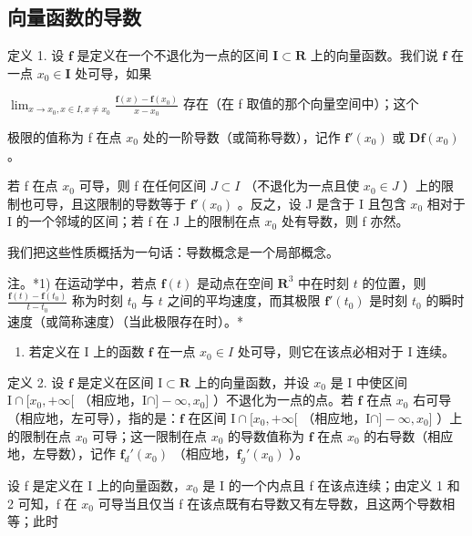 \subsection{向量函数的导数}

定义 1. 设 \(\mathbf{f}\) 是定义在一个不退化为一点的区间 \(\mathbf{I} \subset \mathbf{R}\) 上的向量函数。我们说 \(\mathbf{f}\) 在一点 \(x_0 \in \mathbf{I}\) 处可导，如果

\(\lim_{x\to x_{0},x\in I,x\neq x_{0}}\frac{\mathbf{f}(x)-\mathbf{f}(x_{0})}{x-x_{0}}\) 存在（在 f 取值的那个向量空间中）；这个

极限的值称为 f 在点 \(x_{0}\) 处的一阶导数（或简称导数），记作 \(\mathbf{f}'(x_{0})\) 或 \(\mathbf{D}\mathbf{f}(x_{0})\) 。

若 f 在点 \(x_{0}\) 可导，则 f 在任何区间 \(J \subset I\) （不退化为一点且使 \(x_{0} \in J\) ）上的限制也可导，且这限制的导数等于 \(\mathbf{f}'(x_{0})\) 。反之，设 J 是含于 I 且包含 \(x_{0}\) 相对于 I 的一个邻域的区间；若 f 在 J 上的限制在点 \(x_{0}\) 处有导数，则 f 亦然。

我们把这些性质概括为一句话：导数概念是一个局部概念。

注。*1) 在运动学中，若点 \(\mathbf{f}(t)\) 是动点在空间 \(\mathbf{R}^3\) 中在时刻 \(t\) 的位置，则 \(\frac{\mathbf{f}(t) - \mathbf{f}(t_0)}{t - t_0}\) 称为时刻 \(t_0\) 与 \(t\) 之间的平均速度，而其极限 \(\mathbf{f}'(t_0)\) 是时刻 \(t_0\) 的瞬时速度（或简称速度）（当此极限存在时）。*

\begin{enumerate}
\def\labelenumi{\arabic{enumi})}
\setcounter{enumi}{1}
\tightlist
\item
  若定义在 I 上的函数 \(\mathbf{f}\) 在一点 \(x_0 \in I\) 处可导，则它在该点必相对于 I 连续。
\end{enumerate}

定义 2. 设 \(\mathbf{f}\) 是定义在区间 \(\mathrm{I} \subset \mathbf{R}\) 上的向量函数，并设 \(x_0\) 是 \(\mathrm{I}\) 中使区间 \(\mathrm{I} \cap [x_0, +\infty[\) （相应地，\(\mathrm{I} \cap ] - \infty, x_0]\) ）不退化为一点的点。若 \(\mathbf{f}\) 在点 \(x_0\) 右可导（相应地，左可导），指的是：\(\mathbf{f}\) 在区间 \(\mathrm{I} \cap [x_0, +\infty[\) （相应地，\(\mathrm{I} \cap ] - \infty, x_0]\) ）上的限制在点 \(x_0\) 可导；这一限制在点 \(x_0\) 的导数值称为 \(\mathbf{f}\) 在点 \(x_0\) 的右导数（相应地，左导数），记作 \(\mathbf{f}_d'(x_0)\) （相应地，\(\mathbf{f}_g'(x_0)\) ）。

设 f 是定义在 I 上的向量函数，\(x_{0}\) 是 I 的一个内点且 f 在该点连续；由定义 1 和 2 可知，f 在 \(x_{0}\) 可导当且仅当 f 在该点既有右导数又有左导数，且这两个导数相等；此时

